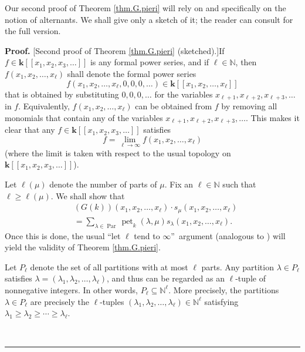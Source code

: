 \documentclass[numbers=enddot,12pt,final,onecolumn,notitlepage]{scrartcl}%
\theoremstyle{definition}
\newenvironment{proof}[1][Proof]{\noindent\textbf{#1.} }{\ \rule{0.5em}{0.5em}}
\let\sumnonlimits\sum
\renewcommand{\sum}{\sumnonlimits\limits}
\newenvironment{vershort}{}{}
\begin{document}
\begin{vershort}
Our second proof of Theorem \ref{thm.G.pieri} will rely on \cite[\S 2.6]%
{GriRei} and specifically on the notion of alternants. We shall give only a
sketch of it; the reader can consult \cite{verlong} for the full version.

\begin{proof}
[Second proof of Theorem \ref{thm.G.pieri} (sketched).]If $f\in\mathbf{k}%
\left[  \left[  x_{1},x_{2},x_{3},\ldots\right]  \right]  $ is any formal
power series, and if $\ell\in\mathbb{N}$, then $f\left(  x_{1},x_{2}%
,\ldots,x_{\ell}\right)  $ shall denote the formal power series%
\[
f\left(  x_{1},x_{2},\ldots,x_{\ell},0,0,0,\ldots\right)  \in\mathbf{k}\left[
\left[  x_{1},x_{2},\ldots,x_{\ell}\right]  \right]
\]
that is obtained by substituting $0,0,0,\ldots$ for the variables $x_{\ell
+1},x_{\ell+2},x_{\ell+3},\ldots$ in $f$. Equivalently, $f\left(  x_{1}%
,x_{2},\ldots,x_{\ell}\right)  $ can be obtained from $f$ by removing all
monomials that contain any of the variables $x_{\ell+1},x_{\ell+2},x_{\ell
+3},\ldots$. This makes it clear that any $f\in\mathbf{k}\left[  \left[
x_{1},x_{2},x_{3},\ldots\right]  \right]  $ satisfies%
\begin{equation}
f=\lim\limits_{\ell\rightarrow\infty}f\left(  x_{1},x_{2},\ldots,x_{\ell
}\right)  \label{pf.thm.G.pieri.short.lim}%
\end{equation}
(where the limit is taken with respect to the usual topology on $\mathbf{k}%
\left[  \left[  x_{1},x_{2},x_{3},\ldots\right]  \right]  $).

Let $\ell\left(  \mu\right)  $ denote the number of parts of $\mu$. Fix an
$\ell\in\mathbb{N}$ such that $\ell\geq\ell\left(  \mu\right)  $. We shall
show that%
\begin{align}
&  \left(  G\left(  k\right)  \right)  \left(  x_{1},x_{2},\ldots,x_{\ell
}\right)  \cdot s_{\mu}\left(  x_{1},x_{2},\ldots,x_{\ell}\right) \nonumber\\
&  =\sum_{\lambda\in\operatorname*{Par}}\operatorname*{pet}\nolimits_{k}%
\left(  \lambda,\mu\right)  s_{\lambda}\left(  x_{1},x_{2},\ldots,x_{\ell
}\right)  . \label{pf.thm.G.pieri.short.lvars}%
\end{align}
Once this is done, the usual \textquotedblleft let $\ell$ tend to $\infty
$\textquotedblright\ argument (analogous to \cite[proof of Corollary
2.6.11]{GriRei}) will yield the validity of Theorem \ref{thm.G.pieri}.

Let $P_{\ell}$ denote the set of all partitions with at most $\ell$ parts. Any
partition $\lambda\in P_{\ell}$ satisfies $\lambda=\left(  \lambda_{1}%
,\lambda_{2},\ldots,\lambda_{\ell}\right)  $, and thus can be regarded as an
$\ell$-tuple of nonnegative integers. In other words, $P_{\ell}\subseteq
\mathbb{N}^{\ell}$. More precisely, the partitions $\lambda\in P_{\ell}$ are
precisely the $\ell$-tuples $\left(  \lambda_{1},\lambda_{2},\ldots
,\lambda_{\ell}\right)  \in\mathbb{N}^{\ell}$ satisfying $\lambda_{1}%
\geq\lambda_{2}\geq\cdots\geq\lambda_{\ell}$.


\end{proof}
\end{vershort}
\end{document}
